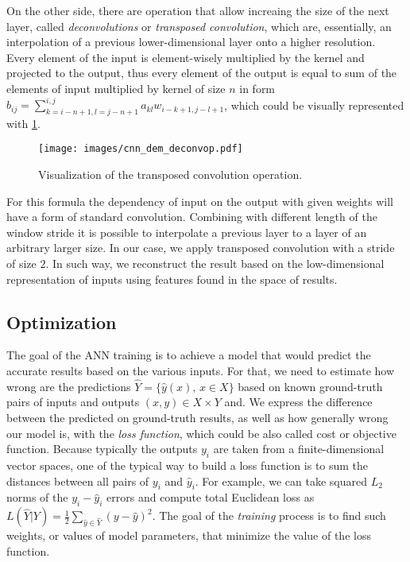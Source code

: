 
On the other side, there are operation that allow increaing the size of the next layer, called \emph{deconvolutions} or \textit{transposed convolution}, which are, essentially, an interpolation of a previous lower-dimensional layer onto a higher resolution.
Every element of the input is element-wisely multiplied by the kernel and projected to the output, thus every element of the output is equal to sum of the elements of input multiplied by kernel of size $n$ in form $b_{ij} = \sum_{k=i-n+1,l=j-n+1}^{i,j} a_{kl}w_{i-k+1,j-l+1}$, which could be visually represented with \ref{fig:deconv_op}.
\begin{figure}
	\centering
	\texttt{[image: images/cnn\_dem\_deconvop.pdf]}
	\label{fig:deconv_op}
	\caption{Visualization of the transposed convolution operation.}
\end{figure}
For this formula the dependency of input on the output with given weights will have a form of standard convolution.
Combining with different length of the window stride it is possible to interpolate a previous layer to a layer of an arbitrary larger size. 
In our case, we apply transposed convolution with a stride of size $2$.
In such way, we reconstruct the result based on the low-dimensional representation of inputs using features found in the space of results.

\medskip


\subsection{Optimization}

The goal of the ANN training is to achieve a model that would predict the accurate results based on the various inputs.
For that, we need to estimate how wrong are the predictions $\hat{Y} = \{\hat{y}(x), \, x \in X \}$ based on known ground-truth pairs of inputs and outputs $ (x, y) \in X \times Y $ and.
We express the difference between the predicted on ground-truth results, as well as how generally wrong our model is, with the \emph{loss function}, which could be also called cost or objective function.
Because typically the outputs $y_{i}$ are taken from a finite-dimensional vector spaces, one of the typical way to build a loss function is to sum the distances between all pairs of $y_{i}$ and $\hat{y}_{i}$.
For example, we can take squared $L_{2}$ norms of the $y_{i}-\hat{y}_{i}$ errors and compute total Euclidean loss as $ L(\hat{Y}|Y) = \frac{1}{2}\sum_{\hat{y} \in \hat{Y}}(y - \hat{y})^{2} $.
The goal of the \emph{training} process is to find such weights, or values of model parameters, that minimize the value of the loss function.
\medskip

